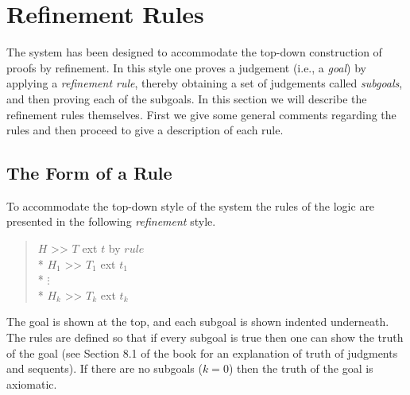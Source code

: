 
\sloppy







\chapter{Refinement Rules}

\label{Rules}
	
The
 \nuprl{} system has been designed to accommodate the
top-down construction of proofs by
refinement.
In this style one proves a judgement (i.e., a {\em goal}) by applying
a {\em refinement rule}, thereby obtaining a set of
judgements called {\em subgoals},
and then proving each of the subgoals.
In this section we will describe the refinement rules themselves.
First we give some general comments regarding the rules and then proceed to
give a description of each rule.

\section{The Form of a Rule}
To accommodate the top-down style of the \nuprl{} system the
rules of the logic are presented in the following
{\em refinement} style.
\begin{quote}
\goal $H$ >> $T$ ext $t$ by $rule$ \\*
\subgoal $H_1$ >> $T_1$ ext $t_1$ \\*
\mbox{\qquad\qquad $\left.\vdots\right.$} \\*
\subgoal $H_k$ >> $T_k$ ext $t_k$
\end{quote}
The goal is shown at the top, and each subgoal is shown
indented underneath.
The rules are defined so that if every subgoal is true then one can show the
truth of the goal (see Section 8.1 of the book for an explanation of
truth of judgments and sequents).
If there are no subgoals ($k=0$) then the truth of the goal is axiomatic.


